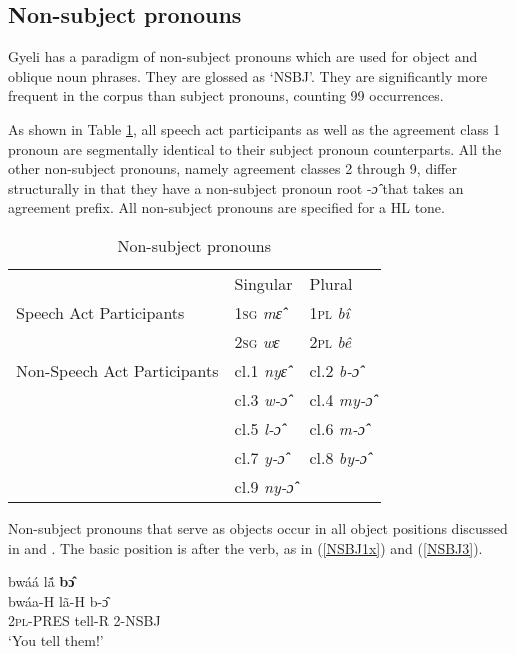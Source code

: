\subsection{Non-subject pronouns}
\label{sec:OBJPRO}


Gyeli has a paradigm of non-subject pronouns which are used for object and oblique noun phrases. They are glossed as `NSBJ'. They are significantly more frequent in the corpus than subject pronouns, counting 99 occurrences.

As shown in Table \ref{Tab:ProOBJ}, all speech act participants as well as the agreement class 1 pronoun are segmentally identical to their subject pronoun counterparts. All the other non-subject pronouns, namely agreement classes 2 through 9, differ structurally in that they have a non-subject pronoun root -{\itshape ɔ̂} that takes an agreement prefix. All non-subject pronouns are specified for a HL tone.

\begin{table} 
\centering
\begin{tabular}{l|l|l}
 \midrule
 & Singular & Plural \\

Speech Act Participants & 1\textsc{sg} {\itshape mɛ̂} & 1\textsc{pl} {\itshape bî} \\
 & 2\textsc{sg} {\itshape wɛ} & 2\textsc{pl} {\itshape bê} \\
 \midrule
Non-Speech Act Participants & cl.1 {\itshape nyɛ̂} & cl.2 {\itshape b-ɔ̂} \\
 & cl.3 {\itshape w-ɔ̂} & cl.4  {\itshape my-ɔ̂} \\
& cl.5 {\itshape l-ɔ̂} & cl.6 {\itshape m-ɔ̂} \\
 & cl.7 {\itshape y-ɔ̂} & cl.8 {\itshape by-ɔ̂} \\
&  cl.9 {\itshape ny-ɔ̂} & \\
 \midrule
\end{tabular}
\caption{Non-subject pronouns}
\label{Tab:ProOBJ}
\end{table}

 Non-subject pronouns that serve as objects occur in all object positions discussed in  and .  The basic position is after the verb, as in (\ref{NSBJ1x}) and (\ref{NSBJ3}). 

\begin{exe} 
\ex\label{NSBJ1x}
  \glll  bwáá lã́ {\bfseries bɔ̂}  \\
         bwáa-H lã-H b-ɔ̂ \\
            2\textsc{pl}-PRES tell-R 2-NSBJ     \\
    \trans `You tell them!'
\end{exe}


